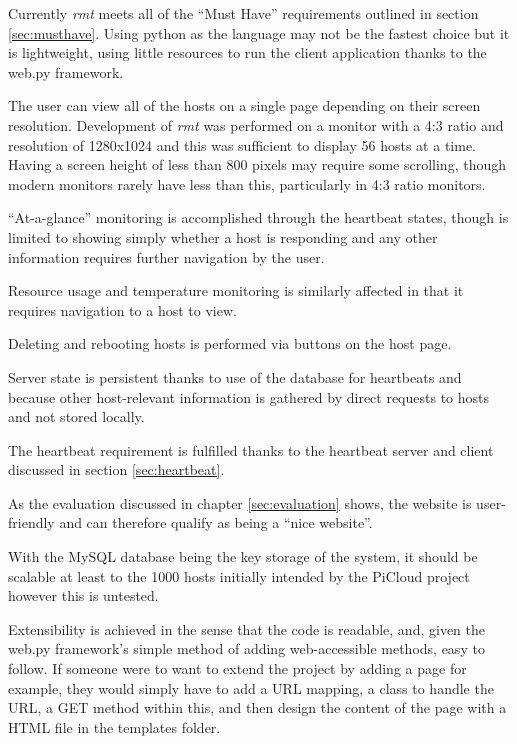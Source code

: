 Currently \emph{rmt} meets all of the ``Must Have'' requirements outlined in section \ref{sec:musthave}.
Using python as the language may not be the fastest choice but it is lightweight, using little resources to run the client application thanks to the web.py framework.

The user can view all of the hosts on a single page depending on their screen resolution.
Development of \emph{rmt} was performed on a monitor with a 4:3 ratio and resolution of 1280x1024 and this was sufficient to display 56 hosts at a time.
Having a screen height of less than 800 pixels may require some scrolling, though modern monitors rarely have less than this, particularly in 4:3 ratio monitors.

``At-a-glance'' monitoring is accomplished through the heartbeat states, though is limited to showing simply whether a host is responding and any other information requires further navigation by the user.

Resource usage and temperature monitoring is similarly affected in that it requires navigation to a host to view.

Deleting and rebooting hosts is performed via buttons on the host page.

Server state is persistent thanks to use of the database for heartbeats and because other host-relevant information is gathered by direct requests to hosts and not stored locally.

The heartbeat requirement is fulfilled thanks to the heartbeat server and client discussed in section \ref{sec:heartbeat}.

As the evaluation discussed in chapter \ref{sec:evaluation}
shows, the website is user-friendly and can therefore qualify as being a ``nice website''.

With the MySQL database being the key storage of the system, it should be scalable at least to the 1000 hosts initially intended by the PiCloud project however this is untested.

Extensibility is achieved in the sense that the code is readable, and, given the web.py framework's simple method of adding web-accessible methods, easy to follow.
If someone were to want to extend the project by adding a page for example, they would simply have to add a URL mapping, a class to handle the URL, a GET method within this, and then design the content of the page with a HTML file in the templates folder.